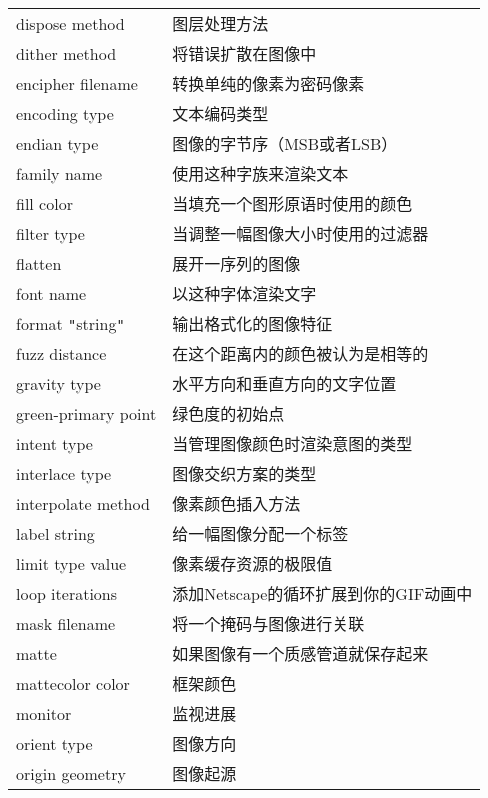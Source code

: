 \documentclass{article}
\begin{document}
\begin{CJK*}{UTF8}{gbsn}
\begin{flushleft}
\begin{longtable}{@{-}ll}
dispose method&图层处理方法\\
dither method&将错误扩散在图像中\\
encipher filename&转换单纯的像素为密码像素\\
encoding type&文本编码类型\\
endian type&图像的字节序（MSB或者LSB）\\
family name&使用这种字族来渲染文本\\
fill color&当填充一个图形原语时使用的颜色\\
filter type&当调整一幅图像大小时使用的过滤器\\
flatten&展开一序列的图像\\
font name&以这种字体渲染文字\\
format \verb|"|string\verb|"|&输出格式化的图像特征\\
fuzz distance&在这个距离内的颜色被认为是相等的\\
gravity type&水平方向和垂直方向的文字位置\\
green-primary point&绿色度的初始点\\
intent type&当管理图像颜色时渲染意图的类型\\
interlace type&图像交织方案的类型\\
interpolate method&像素颜色插入方法\\
label string&给一幅图像分配一个标签\\
limit type value&像素缓存资源的极限值\\
loop iterations&添加Netscape的循环扩展到你的GIF动画中\\
mask filename&将一个掩码与图像进行关联\\
matte&如果图像有一个质感管道就保存起来\\
mattecolor color&框架颜色\\
monitor&监视进展\\
orient type&图像方向\\
origin geometry&图像起源\\
\end{longtable}
\end{flushleft}
\section{}
\end{CJK*}
\end{document}
